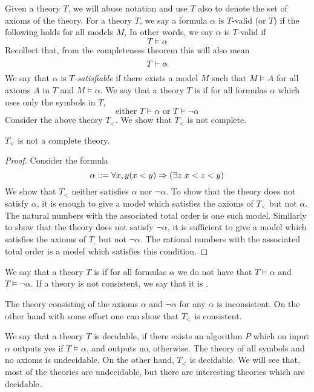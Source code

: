 Given a theory $T$, we will abuse notation and use $T$ also to denote the set of axioms of the theory. For a theory $T$, we say a formula $\alpha$ is $T$-valid (or  $T$) if the following holds for all models $M$,
In other words, we say $\alpha$ is $T$-valid if
\[
T \models \alpha
\]
Recollect that, from the completeness theorem this will also mean
\[
T \vdash \alpha
\]
We say that $\alpha$ is $T$\emph{-satisfiable} if there exists a model $M$ such that $M \models A$ for all axioms $A$ in $T$ and $M \models \alpha$. We say that a theory $T$ is  if for all formulas $\alpha$ which uses only the symbols in $T$,
\[
\text{either } T \models \alpha \text{ or } T \models \neg \alpha
\]
Consider the above theory $T_<$. We show that $T_<$ is not complete.
\begin{lemma}
$T_<$ is not a complete theory.
\end{lemma}
\begin{proof}
Consider the formula 
\[
\alpha ::= \forall x, y (x<y) \Rightarrow (\exists z ~x < z <y)
\]
We show that $T_<$ neither satisfies $\alpha$ nor $\neg \alpha$. To show that the theory does not satisfy $\alpha$, it is enough to give a model which satisfies the axioms of $T_<$ but not $\alpha$. The natural numbers with the associated total order is one such model. Similarly to show that the theory does not satisfy $\neg \alpha$, it is sufficient to give a model which satisfies the axioms of $T_,$ but not $\neg \alpha$. The rational numbers with the associated total order is a model which satisfies this condition. 
\end{proof}

We say that a theory $T$ is  if for all formulas $\alpha$ we do not have that $T \models \alpha$ and $T \models \neg \alpha$. If a theory is not consistent, we say that it is . 
\begin{example}
The theory consisting of the axioms $\alpha$ and $\neg \alpha$ for any $\alpha$ is inconsistent. On the other hand with some effort one can show that $T_<$ is consistent. 
\end{example}
We say that a theory $T$ is decidable, if there exists an algorithm $P$ which on input $\alpha$ outputs yes if $T \models \alpha$, and outputs no, otherwise. The theory of all symbols and no axioms is undecidable. On the other hand, $T_<$ is decidable. We will see that, most of the theories are undecidable, but there are interesting theories which are decidable. 

